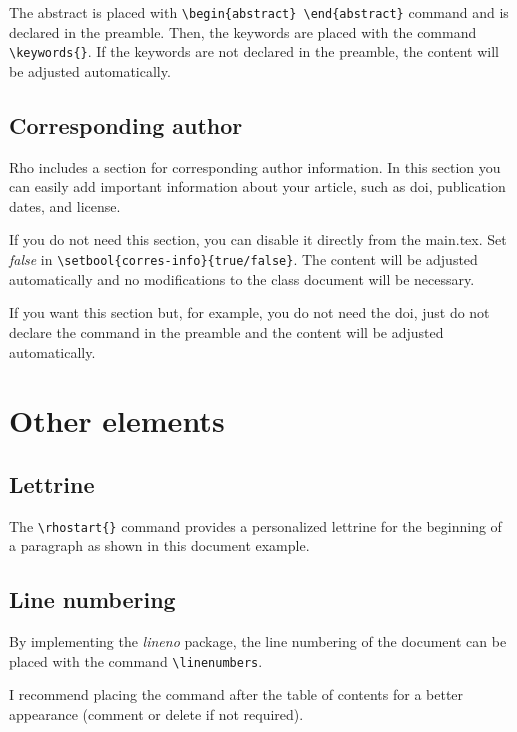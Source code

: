 \documentclass[9pt,a4paper,twoside]{rho-class/rho}
\begin{document}
        The abstract is placed with \verb|\begin{abstract} \end{abstract}| command and is declared in the preamble. Then, the keywords are placed with the command \verb|\keywords{}|. If the keywords are not declared in the preamble, the content will be adjusted automatically.

    \subsection{Corresponding author}

        Rho includes a section for corresponding author information. In this section you can easily add important information about your article, such as doi, publication dates, and license.

        If you do not need this section, you can disable it directly from the main.tex. Set \textit{false} in \verb|\setbool{corres-info}{true/false}|. The content will be adjusted automatically and no modifications to the class document will be necessary.
        
        If you want this section but, for example, you do not need the doi, just do not declare the command in the preamble and the content will be adjusted automatically.

\section{Other elements}

    \subsection{Lettrine}
    
        The \verb*|\rhostart{}| command provides a personalized lettrine for the beginning of a paragraph as shown in this document example.

    \subsection{Line numbering}

        By implementing the \textit{lineno} package, the line numbering of the document can be placed with the command \verb|\linenumbers|. 
		
        I recommend placing the command after the table of contents for a better appearance (comment or delete if not required).
\end{document}
